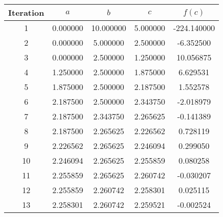 \begin{tabular}{|c|c|c|c|c|}
\hline
Iteration & $a$ & $b$ & $c$ & $f(c)$ \\
\hline
1 & 0.000000 & 10.000000 & 5.000000 & -224.140000 \\
\hline
2 & 0.000000 & 5.000000 & 2.500000 & -6.352500 \\
\hline
3 & 0.000000 & 2.500000 & 1.250000 & 10.056875 \\
\hline
4 & 1.250000 & 2.500000 & 1.875000 & 6.629531 \\
\hline
5 & 1.875000 & 2.500000 & 2.187500 & 1.552578 \\
\hline
6 & 2.187500 & 2.500000 & 2.343750 & -2.018979 \\
\hline
7 & 2.187500 & 2.343750 & 2.265625 & -0.141389 \\
\hline
8 & 2.187500 & 2.265625 & 2.226562 & 0.728119 \\
\hline
9 & 2.226562 & 2.265625 & 2.246094 & 0.299050 \\
\hline
10 & 2.246094 & 2.265625 & 2.255859 & 0.080258 \\
\hline
11 & 2.255859 & 2.265625 & 2.260742 & -0.030207 \\
\hline
12 & 2.255859 & 2.260742 & 2.258301 & 0.025115 \\
\hline
13 & 2.258301 & 2.260742 & 2.259521 & -0.002524 \\
\hline
\end{tabular}